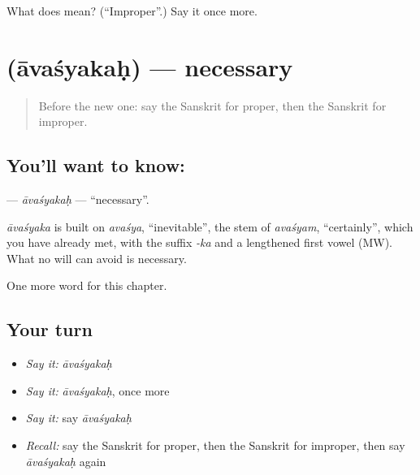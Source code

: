 \begin{tcolorbox}[breakable,colback=teal!4,colframe=teal!35!black,title={Before you move on}]
What does  mean? (\textquotedblleft{}Improper\textquotedblright{}.) Say it once more.
\end{tcolorbox}
\section[\texorpdfstring{\sk{आवश्यकः} (āvaśyakaḥ)}{आवश्यकः (āvaśyakaḥ)}]{ (āvaśyakaḥ) — necessary}

\label{lesson:SA-C244-avasyakah}



\begin{quote}
Before the new one: say the Sanskrit for proper, then the Sanskrit for improper.
\end{quote}

\subsection*{You'll want to know: }
\textbf{} — \emph{āvaśyakaḥ} — \textquotedblleft{}necessary\textquotedblright{}.

\begin{cousinweb}
\emph{āvaśyaka} is built on \emph{avaśya}, \textquotedblleft{}inevitable\textquotedblright{}, the stem of \emph{avaśyam}, \textquotedblleft{}certainly\textquotedblright{}, which you have already met, with the suffix \emph{-ka} and a lengthened first vowel (MW). What no will can avoid is necessary.
\end{cousinweb}

\begin{grammarlens}[title={What you've built}]
One more word for this chapter.
\end{grammarlens}

\subsection*{Your turn}
\begin{itemize}
\raggedright
  \item \emph{Say it:} \emph{āvaśyakaḥ}
  \item \emph{Say it:} \emph{āvaśyakaḥ}, once more
  \item \emph{Say it:} say \emph{āvaśyakaḥ}
  \item \emph{Recall:} say the Sanskrit for proper, then the Sanskrit for improper, then say \emph{āvaśyakaḥ} again
\end{itemize}

